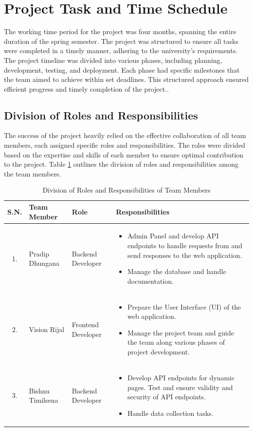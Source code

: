 \documentclass[12pt, a4paper, oneside]{article}
\begin{document}
\section{Project Task and Time Schedule}
The working time period for the project was four months, spanning the entire duration of the spring semester. The project was structured to ensure all tasks were completed in a timely manner, adhering to the university's requirements. The project timeline was divided into various phases, including planning, development, testing, and deployment. Each phase had specific milestones that the team aimed to achieve within set deadlines. This structured approach ensured efficient progress and timely completion of the project..
\subsection{Division of Roles and Responsibilities}
The success of the project heavily relied on the effective collaboration of all team members, each assigned specific roles and responsibilities. The roles were divided based on the expertise and skills of each member to ensure optimal contribution to the project. Table \ref{table:team-roles} outlines the division of roles and responsibilities among the team members.
\begin{table}[!ht]
\begin{tabularx}{\textwidth}{|c|l|l|X|}
    \hline
    \rowcolor[HTML]{C0C0C0} 
    \textbf{S.N.} & \textbf{Team Member} & \textbf{Role} & \textbf{Responsibilities} \\ \hline
    1. & Pradip Dhungana & Backend Developer & 
    \begin{itemize}
        \item Admin Panel and develop API endpoints to handle requests from and send responses to the web application.
        \item Manage the database and handle documentation.
    \end{itemize}
    \\ \hline
    2. & Vision Rijal & Frontend Developer & 
    \begin{itemize}
        \item Prepare the User Interface (UI) of the web application.
        \item Manage the project team and guide the team along various phases of project development.
    \end{itemize}
    \\ \hline
    3. & Bishnu Timilsena & Backend Developer &  
    \begin{itemize}
        \item Develop API endpoints for dynamic pages. Test and ensure validity and security of API endpoints.
        \item Handle data collection tasks.
    \end{itemize}
    \\ \hline
\end{tabularx}
\caption{Division of Roles and Responsibilities of Team Members}
\label{table:team-roles}
\end{table}
\pagebreak
\end{document}
